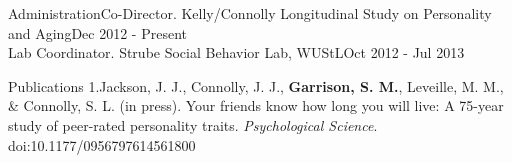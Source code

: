 \documentclass {resume}
\newcommand{\meb}{{\bf Garrison, S. M.}\xspace}
\begin{document}
\begin{samepage}\begin{rSection}{\textrm{Administration}}Co-Director. Kelly/Connolly Longitudinal Study on Personality and Aging\hfill Dec 2012 - Present\smallskip\\
Lab Coordinator. Strube Social Behavior Lab,  WUStL\hfill Oct 2012 - Jul 2013
\end{rSection}\end{samepage}%


\begin{rSection}{\textrm{Publications}}%
1.\hspace* {2.5mm}Jackson, J. J., Connolly, J. J., \meb, Leveille, M. M., \& Connolly, S. L. (in press). Your friends know \hspace* {6 mm}how long you will live: A 75-year study of peer-rated personality traits. \textit{Psychological Science}. \newline\hspace* {6 mm}doi:10.1177/0956797614561800\\
\end{rSection}
\end{document}
